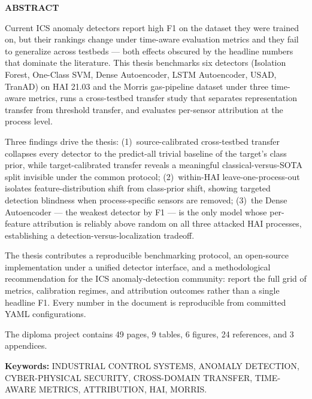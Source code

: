 \thispagestyle{empty}
\begin{center}
{\Large \textbf{ABSTRACT}\par}
\end{center}
\vspace{0.5cm}

Current ICS anomaly detectors report high F1 on the dataset they were trained on, but their rankings change under time-aware evaluation metrics and they fail to generalize across testbeds --- both effects obscured by the headline numbers that dominate the literature.  This thesis benchmarks six detectors (Isolation Forest, One-Class SVM, Dense Autoencoder, LSTM Autoencoder, USAD, TranAD) on HAI 21.03 and the Morris gas-pipeline dataset under three time-aware metrics, runs a cross-testbed transfer study that separates representation transfer from threshold transfer, and evaluates per-sensor attribution at the process level.

Three findings drive the thesis: (1)~source-calibrated cross-testbed transfer collapses every detector to the predict-all trivial baseline of the target's class prior, while target-calibrated transfer reveals a meaningful classical-versus-SOTA split invisible under the common protocol; (2)~within-HAI leave-one-process-out isolates feature-distribution shift from class-prior shift, showing targeted detection blindness when process-specific sensors are removed; (3)~the Dense Autoencoder --- the weakest detector by F1 --- is the only model whose per-feature attribution is reliably above random on all three attacked HAI processes, establishing a detection-versus-localization tradeoff.

The thesis contributes a reproducible benchmarking protocol, an open-source implementation under a unified detector interface, and a methodological recommendation for the ICS anomaly-detection community: report the full grid of metrics, calibration regimes, and attribution outcomes rather than a single headline F1.  Every number in the document is reproducible from committed YAML configurations.

\vspace{0.3cm}

The diploma project contains 49 pages, 9 tables, 6 figures, 24 references, and 3 appendices.

\vspace{0.3cm}
\noindent\textbf{Keywords:} INDUSTRIAL CONTROL SYSTEMS, ANOMALY DETECTION, CYBER-PHYSICAL SECURITY, CROSS-DOMAIN TRANSFER, TIME-AWARE METRICS, ATTRIBUTION, HAI, MORRIS.

\newpage
